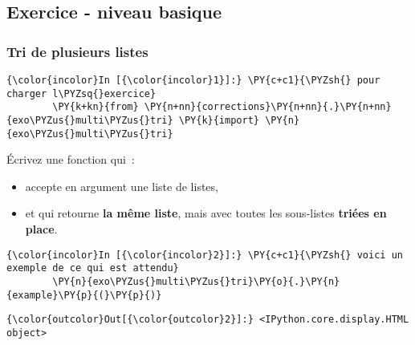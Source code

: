     
    
    
    

    

    \hypertarget{exercice---niveau-basique}{%
\subsection{Exercice - niveau basique}\label{exercice---niveau-basique}}

    \hypertarget{tri-de-plusieurs-listes}{%
\subsubsection{Tri de plusieurs listes}\label{tri-de-plusieurs-listes}}

    \begin{Verbatim}[commandchars=\\\{\},frame=single,framerule=0.3mm,rulecolor=\color{cellframecolor}]
{\color{incolor}In [{\color{incolor}1}]:} \PY{c+c1}{\PYZsh{} pour charger l\PYZsq{}exercice}
        \PY{k+kn}{from} \PY{n+nn}{corrections}\PY{n+nn}{.}\PY{n+nn}{exo\PYZus{}multi\PYZus{}tri} \PY{k}{import} \PY{n}{exo\PYZus{}multi\PYZus{}tri}
\end{Verbatim}


    Écrivez une fonction qui~:

\begin{itemize}
\tightlist
\item
  accepte en argument une liste de listes,
\item
  et qui retourne \textbf{la même liste}, mais avec toutes les
  sous-listes \textbf{triées en place}.
\end{itemize}

    \begin{Verbatim}[commandchars=\\\{\},frame=single,framerule=0.3mm,rulecolor=\color{cellframecolor}]
{\color{incolor}In [{\color{incolor}2}]:} \PY{c+c1}{\PYZsh{} voici un exemple de ce qui est attendu}
        \PY{n}{exo\PYZus{}multi\PYZus{}tri}\PY{o}{.}\PY{n}{example}\PY{p}{(}\PY{p}{)}
\end{Verbatim}


\begin{Verbatim}[commandchars=\\\{\},frame=single,framerule=0.3mm,rulecolor=\color{cellframecolor}]
{\color{outcolor}Out[{\color{outcolor}2}]:} <IPython.core.display.HTML object>
\end{Verbatim}
            

